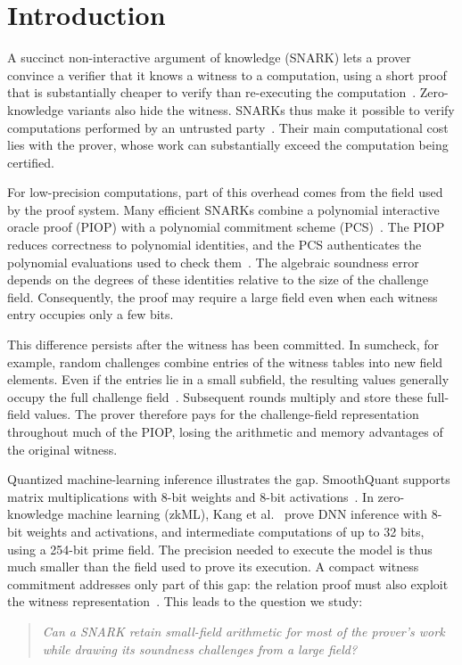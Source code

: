 \section{Introduction}

A succinct non-interactive argument of knowledge (SNARK) lets a
prover convince a verifier that it knows a witness to a computation,
using a short proof that is substantially cheaper to verify than
re-executing the computation~\cite{innovations/BitanskyCCT12}.
Zero-knowledge variants also hide the
witness. SNARKs thus make it possible to verify computations
performed by an untrusted party~\cite{eurocrypt/Groth16,crypto/Setty20}.
Their main computational cost lies with the prover, whose work can
substantially exceed the computation being certified.

For low-precision computations, part of this overhead comes from
the field used by the proof system. Many efficient SNARKs combine a
polynomial interactive oracle proof (PIOP) with a polynomial
commitment scheme (PCS)~\cite{eurocrypt/BunzFS20,eurocrypt/ChiesaHMMVW20}.
The PIOP reduces correctness to polynomial
identities, and the PCS authenticates the polynomial evaluations
used to check them~\cite{crypto/Setty20,eurocrypt/ChenBBZ23}.
The algebraic soundness error depends on the degrees of these
identities relative to the size of the challenge field.
Consequently, the proof may require a large field even when each
witness entry occupies only a few bits.

This difference persists after the witness has been committed.
In sumcheck, for example, random challenges combine entries of the
witness tables into new field elements. Even if the entries lie in
a small subfield, the resulting values generally occupy the full
challenge field~\cite{iacr/BagadDDT25}.
Subsequent rounds multiply and store these full-field values.
The prover therefore pays for the challenge-field representation
throughout much of the PIOP, losing the arithmetic and memory
advantages of the original witness.

Quantized machine-learning inference illustrates the gap.
SmoothQuant supports matrix multiplications with 8-bit weights and
8-bit activations~\cite{icml/XiaoLSWDH23}.
In zero-knowledge machine learning (zkML), Kang et al.~\cite{corr/KangHSS22}
prove DNN inference with 8-bit weights and
activations, and intermediate computations of up to 32 bits,
using a 254-bit prime field.
The precision needed to execute the model is thus much smaller
than the field used to prove its execution. A compact witness
commitment addresses only part of this gap: the relation proof
must also exploit the witness representation~\cite{eurocrypt/DiamondP26,iacr/BagadDDT25}.
This leads to the question we study:
\begin{quote}
\emph{Can a SNARK retain small-field arithmetic for most of the
prover's work while drawing its soundness challenges from a large field?}
\end{quote}

